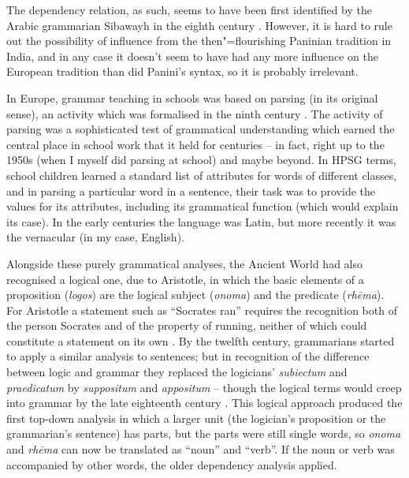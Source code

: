 \documentclass[output=paper
	        ,collection
	        ,collectionchapter
 	        ,biblatex
                ,babelshorthands
                ,newtxmath
                ,draftmode
                ,colorlinks, citecolor=brown
]{langscibook}
\begin{document}
The dependency relation, as such, seems to have been first identified by the Arabic grammarian Sibawayh in the eighth century \citep{Owens1988,Kouloughli1999}. However, it is hard to rule out the possibility of influence from the then"=flourishing Paninian tradition in India, and in any case it doesn’t seem to have had any more influence on the European tradition than did Panini’s syntax, so it is probably irrelevant.

In Europe, grammar teaching in schools was based on parsing (in its original sense), an activity which was formalised in the ninth century \citep{Luhtala1994}. The activity of parsing was a sophisticated test of grammatical understanding which earned the central place in school work that it held for centuries – in fact, right up to the 1950s (when I myself did parsing at school) and maybe beyond. In HPSG terms, school children learned a standard list of attributes for words of different classes, and in parsing a particular word in a sentence, their task was to provide the values for its attributes, including its grammatical function (which would explain its case). In the early centuries the language was Latin, but more recently it was the vernacular (in my case, English).

Alongside these purely grammatical analyses, the Ancient World had also recognised a logical one, due to Aristotle, in which the basic elements of a proposition (\emph{logos}) are the logical subject (\emph{onoma}) and the predicate (\emph{rhēma}). For Aristotle a statement such as ``Socrates ran'' requires the recognition both of the person Socrates and of the property of running, neither of which could constitute a statement on its own \citep[30–31]{Law2003}. By the twelfth century, grammarians started to apply a similar analysis to sentences; but in recognition of the difference between logic and grammar they replaced the logicians’ \emph{subiectum} and \emph{praedicatum} by \emph{suppositum} and \emph{appositum} – though the logical terms would creep into grammar by the late eighteenth century \citep[168]{Law2003}. This logical approach produced the first top-down analysis in which a larger unit (the logician’s proposition or the grammarian’s sentence) has parts, but the parts were still single words, so \emph{onoma} and \emph{rhēma} can now be translated as ``noun'' and ``verb''. If the noun or verb was accompanied by other words, the older dependency analysis applied.
\end{document}
